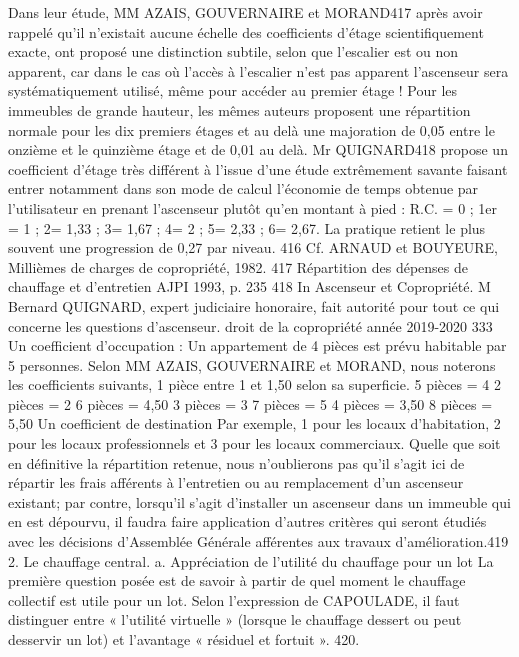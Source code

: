 		Dans leur étude, MM AZAIS, GOUVERNAIRE et MORAND417 après avoir rappelé qu'il n'existait aucune échelle des coefficients d'étage scientifiquement exacte, ont proposé une distinction subtile, selon que l'escalier est ou non apparent, car dans le cas où l'accès à l'escalier n'est pas apparent l'ascenseur sera systématiquement utilisé, même pour accéder au premier étage !
		Pour les immeubles de grande hauteur, les mêmes auteurs proposent une répartition normale pour les dix premiers étages et au delà une majoration de 0,05 entre le onzième et le quinzième étage et de 0,01 au delà.
		Mr QUIGNARD418 propose un coefficient d’étage très différent à l’issue d’une étude extrêmement savante faisant entrer notamment dans son mode de calcul l’économie de temps obtenue par l’utilisateur en prenant l’ascenseur plutôt qu’en montant à pied :
		R.C. = 0 ; 1er = 1 ; 2\degres = 1,33 ; 3\degres = 1,67 ; 4\degres = 2 ; 5\degres = 2,33 ; 6\degres = 2,67.
		La pratique retient le plus souvent une progression de 0,27 par niveau.
		416 Cf. ARNAUD et BOUYEURE, Millièmes de charges de copropriété, 1982.
		417 Répartition des dépenses de chauffage et d’entretien AJPI 1993, p. 235
		418 In Ascenseur et Copropriété. M Bernard QUIGNARD, expert judiciaire honoraire, fait autorité pour tout ce qui concerne les questions d’ascenseur.
		droit de la copropriété année 2019-2020
		333
		Un coefficient d'occupation :
		Un appartement de 4 pièces est prévu habitable par 5 personnes. Selon MM AZAIS, GOUVERNAIRE et MORAND, nous noterons les coefficients suivants,
		1 pièce entre 1 et 1,50 selon sa superficie. 5 pièces = 4
		2 pièces = 2 6 pièces = 4,50
		3 pièces = 3 7 pièces = 5
		4 pièces = 3,50 8 pièces = 5,50
		Un coefficient de destination
		Par exemple, 1 pour les locaux d'habitation, 2 pour les locaux professionnels et 3 pour les locaux commerciaux.
		Quelle que soit en définitive la répartition retenue, nous n'oublierons pas qu'il s'agit ici de répartir les frais afférents à l'entretien ou au remplacement d'un ascenseur existant; par contre, lorsqu’il s'agit d'installer un ascenseur dans un immeuble qui en est dépourvu, il faudra faire application d'autres critères qui seront étudiés avec les décisions d'Assemblée Générale afférentes aux travaux d'amélioration.419
		2. Le chauffage central.
		a. Appréciation de l’utilité du chauffage pour un lot
		La première question posée est de savoir à partir de quel moment le chauffage collectif est utile pour un lot. Selon l’expression de CAPOULADE, il faut distinguer entre « l’utilité virtuelle » (lorsque le chauffage dessert ou peut desservir un lot) et l’avantage « résiduel et fortuit ». 420.
